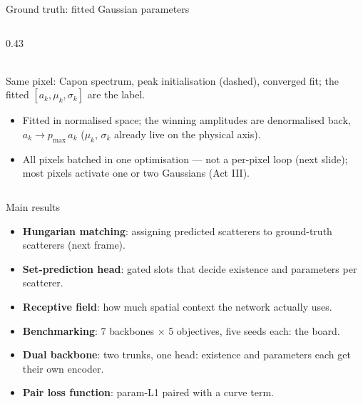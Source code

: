 \documentclass[aspectratio=169,9pt]{beamer}
\begin{document}
\begin{frame}{Ground truth: fitted Gaussian parameters}
\begin{columns}[T]
\begin{column}{0.43\textwidth}
      \\[2pt]
      {\scriptsize Same pixel: \textcolor{soft}{Capon spectrum},
       \textcolor{accent!60}{peak initialisation (dashed)},
       \textcolor{accent}{converged fit}; the fitted $[a_k,\mu_k,\sigma_k]$ are the label.}
      \begin{itemize}
        \item {\footnotesize Fitted in normalised space; the winning amplitudes are
              denormalised back, $a_k \to p_{\max}\, a_k$ ($\mu_k$, $\sigma_k$ already
              live on the physical axis).}
        \item {\footnotesize All pixels batched in one optimisation --- not a per-pixel
              loop (next slide); most pixels activate one or two Gaussians (Act III).}
      \end{itemize}
    \end{column}
  \end{columns}
\end{frame}

\begin{frame}{Main results}
  \begin{itemize}\setlength{\itemsep}{12pt}
    \item \textbf{Hungarian matching}: assigning predicted scatterers to ground-truth scatterers (next frame).
    \item \textbf{Set-prediction head}: gated slots that decide existence and parameters per scatterer.
    \item \textbf{Receptive field}: how much spatial context the network actually uses.
    \item \textbf{Benchmarking}: 7 backbones $\times$ 5 objectives, five seeds each: the board.
    \item \textbf{Dual backbone}: two trunks, one head: existence and parameters each get their own encoder.
    \item \textbf{Pair loss function}: param-L1 paired with a curve term.
  \end{itemize}
\end{frame}
\end{document}
